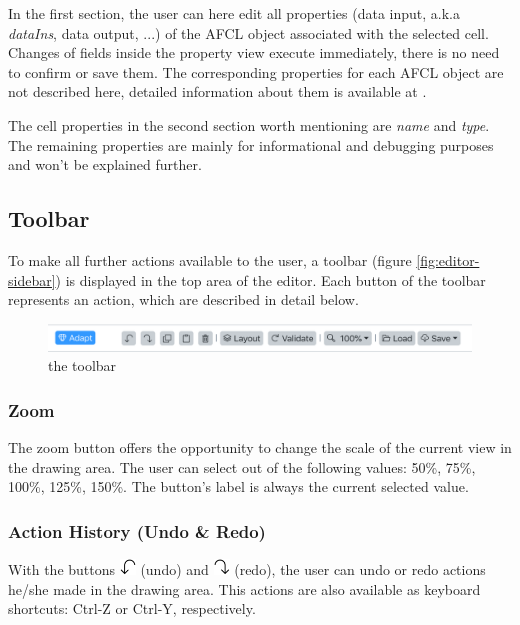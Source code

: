 \documentclass[a4paper,top=25mm,bottom=25mm,12pt,pdftex,halfparskip,twoside,openany,bibtotoc,numbers=noenddot]{scrbook}
\begin{document}
In the first section, the user can here edit all properties (data input, a.k.a \textit{dataIns}, data output, ...) of the AFCL object associated with the selected cell. Changes of fields inside the property view execute immediately, there is no need to confirm or save them.
The corresponding properties for each AFCL object are not described here, detailed information about them is available at \citep{online-afcl-dps}.

The cell properties in the second section worth mentioning are \textit{name} and \textit{type}. The remaining properties are mainly for informational and debugging purposes and won't be explained further.

\subsection{Toolbar}

To make all further actions available to the user, a toolbar (figure \ref{fig:editor-sidebar}) is displayed in the top area of the editor. Each button of the toolbar represents an action, which are described in detail below.

\begin{figure}[H]
\centering
\includegraphics[width=\textwidth]{toolbar}
\caption{the toolbar}
\label{fig:editor-toolbar}
\end{figure}

\subsubsection{Zoom}

The zoom button offers the opportunity to change the scale of the current view in the drawing area. The user can select out of the following values: 50\%, 75\%, 100\%, 125\%, 150\%. The button's label is always the current selected value.

\subsubsection{Action History (Undo \& Redo)}

With the buttons \includegraphics[height=12pt]{editor-toolbar-undo} (undo) and \includegraphics[height=12pt]{editor-toolbar-redo} (redo), the user can undo or redo actions he/she made in the drawing area. This actions are also available as keyboard shortcuts: \textsf{Ctrl-Z} or \textsf{Ctrl-Y}, respectively.
\end{document}
